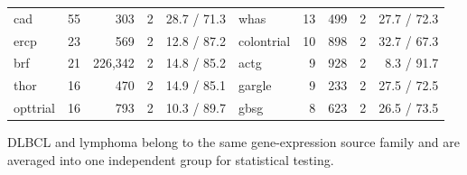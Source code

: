 \begin{table}[!b]
\begin{threeparttable}
\begin{tabular}{@{}lrrrr@{\hspace{28pt}}lrrrr@{}}
cad               &     55 &   303 &  2 & 28.7 / 71.3 & whas       &  13 &   499 &  2 & 27.7 / 72.3 \\
ercp              &     23 &   569 &  2 & 12.8 / 87.2 & colontrial &  10 &   898 &  2 & 32.7 / 67.3 \\
brf               &     21 & 226,342 & 2 & 14.8 / 85.2 & actg      &   9 &   928 &  2 &  8.3 / 91.7 \\
thor              &     16 &   470 &  2 & 14.9 / 85.1 & gargle     &   9 &   233 &  2 & 27.5 / 72.5 \\
opttrial          &     16 &   793 &  2 & 10.3 / 89.7 & gbsg       &   8 &   623 &  2 & 26.5 / 73.5 \\
\bottomrule
\end{tabular}
\begin{tablenotes}[flushleft]
\scriptsize
\item[a] DLBCL and lymphoma belong to the same gene-expression source family and are averaged into one independent group for statistical testing.
\end{tablenotes}
\end{threeparttable}
\end{table}

